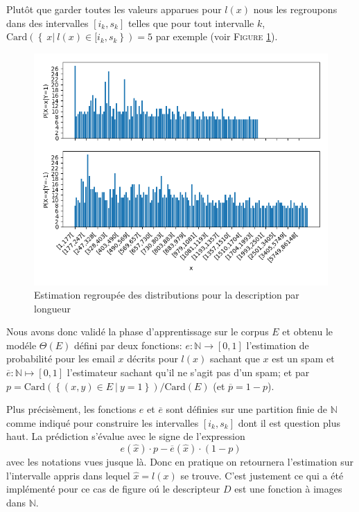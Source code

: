 \documentclass[a4paper, french]{article}
\begin{document}
Plut\^ot que garder toutes les valeurs apparues pour $l(x)$ nous les regroupons 
dans des intervalles $[i_k,s_k]$ telles que pour tout intervalle $k$, 
$\text{Card}\left(\left\{\ x|\ l(x)\in [i_k,s_k\right\}\right)=5$ par exemple
(voir F\textsc{igure} \ref{fig:histo5corpus}).

\begin{figure}[h!]
\begin{center}
    \caption{Estimation regroup\'ee des distributions pour la description par longueur}
    \label{fig:histo5corpus}
    \includegraphics[width=13cm]{histo5}
\end{center}
\end{figure}

\pagebreak
Nous avons donc valid\'e la phase d'apprentissage sur le corpus $E$ et obtenu
le mod\'ele $\Theta(E)$ d\'efini par deux fonctions: 
$e\colon\mathbb{N}\rightarrow [0,1]$ l'estimation de probabilit\'e 
pour les email $x$ d\'ecrits pour $l(x)$ sachant que $x$ est un spam
et $\overline{e}\colon\mathbb{N}\mapsto [0,1]$ l'estimateur sachant qu'il ne s'agit
pas d'un spam; et par $p=\text{Card}\left(\left\{(x,y)\in E\ |\ y=1\right\}\right)/%
\text{Card}(E)$ (et $\overline{p}=1-p$).

Plus pr\'ecis\`ement, les fonctions $e$ et $\overline{e}$ sont d\'efinies 
sur une partition finie de $\mathbb{N}$ comme indiqu\'e
pour construire les intervalles $[i_k,s_k]$ dont il est question plus haut.
La pr\'ediction s'\'evalue avec le signe de l'expression
\begin{equation}
    e(\hat{x}) \cdot p - \overline{e}(\hat{x}) \cdot (1-p)
\end{equation}
avec les notations vues jusque l\`a. Donc en pratique on retournera l'estimation 
sur l'intervalle appris dans lequel $\hat{x}=l(x)$ se trouve. C'est justement ce
qui a \'et\'e impl\'ement\'e pour ce cas de figure o\'u le descripteur $D$ est une
fonction \`a images dans $\mathbb{N}$.
\end{document}
